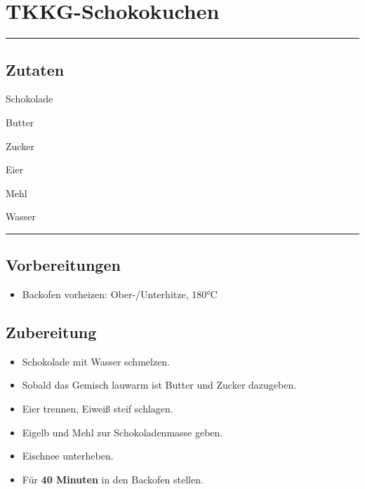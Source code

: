 \section*{TKKG-Schokokuchen}

\bigbreak
\rule{\textwidth}{0.4pt}

\subsection*{Zutaten}

\begin{description}[align=right,leftmargin=!,labelwidth=\widthof{\bfseries xxPrisen}]
    \item[200g] Schokolade
    \item[100g] Butter
    \item[140g] Zucker
    \item[3] Eier
    \item[60g] Mehl
    \item[2 EL] Wasser
\end{description}


\rule{\textwidth}{0.4pt}


\subsection*{Vorbereitungen}

\begin{itemize}
    \item Backofen vorheizen: Ober-/Unterhitze, 180°C
\end{itemize}


\bigbreak
\subsection*{Zubereitung}

\begin{itemize}
    \item Schokolade mit Wasser schmelzen.
    \item Sobald das Gemisch lauwarm ist Butter und Zucker dazugeben.
    \item Eier trennen, Eiweiß steif schlagen.
    \item Eigelb und Mehl zur Schokoladenmasse geben.
    \item Eischnee unterheben.
    \item Für \textbf{40 Minuten} in den Backofen stellen.
\end{itemize}
